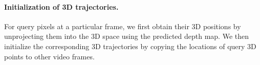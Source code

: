 
\paragraph{Initialization of 3D trajectories.}
For query pixels at a particular frame, we first obtain their 3D positions by unprojecting them into the 3D space using the predicted depth map.
We then initialize the corresponding 3D trajectories by copying the locations of query 3D points to other video frames.



